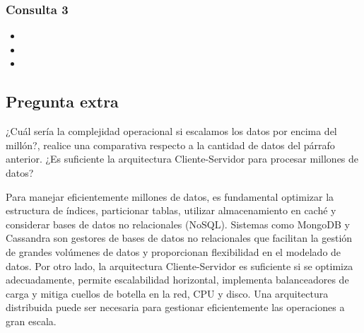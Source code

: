 \subsubsection{Consulta 3}
\begin{itemize}
	\item{}
	\item{}
	\item{}
\end{itemize}
\subsection{Pregunta extra}
¿Cuál sería la complejidad operacional si escalamos los datos por encima del millón?, realice una comparativa respecto a la cantidad de datos del párrafo anterior. ¿Es suficiente la arquitectura Cliente-Servidor para procesar millones de datos?

Para manejar eficientemente millones de datos, es fundamental optimizar la estructura de índices, particionar tablas, utilizar almacenamiento en caché y considerar bases de datos no relacionales (NoSQL). Sistemas como MongoDB y Cassandra son gestores de bases de datos no relacionales que facilitan la gestión de grandes volúmenes de datos y proporcionan flexibilidad en el modelado de datos. Por otro lado, la arquitectura Cliente-Servidor es suficiente si se optimiza adecuadamente, permite escalabilidad horizontal, implementa balanceadores de carga y mitiga cuellos de botella en la red, CPU y disco. Una arquitectura distribuida puede ser necesaria para gestionar eficientemente las operaciones a gran escala.